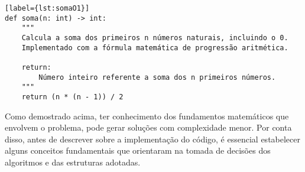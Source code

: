 \begin{lstlisting}[caption={Função soma com complexidade constante}][label={lst:somaO1}]
def soma(n: int) -> int:
    """
    Calcula a soma dos primeiros n números naturais, incluindo o 0.
    Implementado com a fórmula matemática de progressão aritmética.

    return:
        Número inteiro referente a soma dos n primeiros números.
    """
    return (n * (n - 1)) / 2
\end{lstlisting}


Como demostrado acima, ter conhecimento dos fundamentos matemáticos que envolvem o problema, pode gerar soluções com 
complexidade menor. Por conta disso, antes de descrever sobre a implementação do código, é essencial estabelecer alguns 
conceitos fundamentais que orientaram na tomada de decisões dos algoritmos e das estruturas adotadas.
	